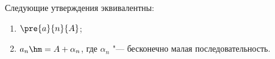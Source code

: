 
    Следующие утверждения эквивалентны:

    \begin{enumerate}
        \item  $\pre{a}{n}{A}$;

        \item $a_n\hm=A+\alpha_n$, где $\alpha_n$ "--- бесконечно малая последовательность.
    \end{enumerate}
    